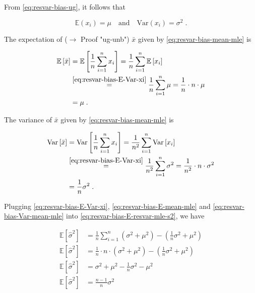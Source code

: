 \documentclass[a4paper,12pt]{book}
\begin{document}
From \eqref{eq:resvar-bias-ug}, it follows that

\begin{equation} \label{eq:resvar-bias-E-Var-xi}
\mathbb{E}(x_i) = \mu \quad \text{and} \quad \mathrm{Var}(x_i) = \sigma^2 \; .
\end{equation}

The expectation of ($\rightarrow$ Proof "ug-unb") $\bar{x}$ given by \eqref{eq:resvar-bias-mean-mle} is

\begin{equation} \label{eq:resvar-bias-E-mean-mle}
\begin{split}
\mathbb{E}\left[ \bar{x} \right] &= \mathbb{E}\left[ \frac{1}{n} \sum_{i=1}^{n} x_i \right] = \frac{1}{n} \sum_{i=1}^{n} \mathbb{E}\left[ x_i \right] \\
&\overset{\eqref{eq:resvar-bias-E-Var-xi}}{=} \frac{1}{n} \sum_{i=1}^{n} \mu = \frac{1}{n} \cdot n \cdot \mu \\
&= \mu \; .
\end{split}
\end{equation}

The variance of $\bar{x}$ given by \eqref{eq:resvar-bias-mean-mle} is

\begin{equation} \label{eq:resvar-bias-Var-mean-mle}
\begin{split}
\mathrm{Var}\left[ \bar{x} \right] &= \mathrm{Var}\left[ \frac{1}{n} \sum_{i=1}^{n} x_i \right] = \frac{1}{n^2} \sum_{i=1}^{n} \mathrm{Var}\left[ x_i \right] \\
&\overset{\eqref{eq:resvar-bias-E-Var-xi}}{=} \frac{1}{n^2} \sum_{i=1}^{n} \sigma^2 = \frac{1}{n^2} \cdot n \cdot \sigma^2 \\
&= \frac{1}{n} \sigma^2 \; .
\end{split}
\end{equation}

Plugging \eqref{eq:resvar-bias-E-Var-xi}, \eqref{eq:resvar-bias-E-mean-mle} and \eqref{eq:resvar-bias-Var-mean-mle} into \eqref{eq:resvar-bias-E-resvar-mle-s2}, we have

\begin{equation} \label{eq:resvar-bias-E-resvar-mle-s3}
\begin{split}
\mathbb{E}\left[ \hat{\sigma}^2 \right] &= \frac{1}{n} \sum_{i=1}^{n} \left( \sigma^2 + \mu^2 \right) - \left( \frac{1}{n} \sigma^2 + \mu^2 \right) \\
\mathbb{E}\left[ \hat{\sigma}^2 \right] &= \frac{1}{n} \cdot n \cdot \left( \sigma^2 + \mu^2 \right) - \left( \frac{1}{n} \sigma^2 + \mu^2 \right) \\
\mathbb{E}\left[ \hat{\sigma}^2 \right] &= \sigma^2 + \mu^2 - \frac{1}{n} \sigma^2 - \mu^2 \\
\mathbb{E}\left[ \hat{\sigma}^2 \right] &= \frac{n-1}{n} \sigma^2
\end{split}
\end{equation}
\end{document}
